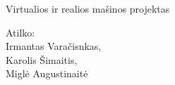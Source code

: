 \documentclass[a4paper,12pt]{article}
\begin{document}
\begin{titlepage}
	\begin{center}
		\Huge Virtualios ir realios mašinos projektas\\
		[4cm]
		\end{center}
		\begin{flushright}
		Atilko:\\
		Irmantas Varačisnkas,\\
		Karolis Šimaitis,\\
		Miglė Augustinaitė\\
		\end{flushright}
\end{titlepage}	
\tableofcontents
\newpage



\end{document}
